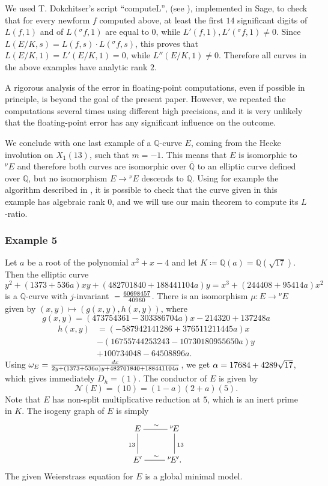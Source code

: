 \documentclass[11pt]{amsart}
\theoremstyle{definition}
\begin{document}
		We used T. Dokchitser's script ``computeL'', (see \cite{computeL}), implemented in Sage, to check that for every newform $f$ computed above, at least the first $14$ significant digits of $L(f,1)$ and of $L({{}^\sigma\!} f,1)$ are equal to $0$, while $L'(f,1),L'({{}^\sigma\!} f,1)\neq 0$. Since $L(E/K,s)=L(f,s)\cdot L({{}^\sigma\!} f,s)$, this proves that $L(E/K,1)=L'(E/K,1)=0$, while $L''(E/K,1)\neq 0$. Therefore all curves in the above examples have analytic rank $2$.

		A rigorous analysis of the error in floating-point computations, even if possible in principle, is beyond the goal of the present paper. However, we repeated the computations several times using different high precisions, and it is very unlikely that the floating-point error has any significant influence on the outcome.
		

		We conclude with one last example of a ${\mathbb{Q}}$-curve $E$, coming from the Hecke involution on $X_1(13)$, such that $m=-1$. This means that $E$ is isomorphic to ${{}^\nu\!} E$ and therefore both curves are isomorphic over ${\overline{\mathbb{Q}}}$ to an elliptic curve defined over ${\mathbb{Q}}$, but no isomorphism $E\to {{}^\nu\!} E$ descends to ${\mathbb{Q}}$. Using for example the algorithm described in \cite{sim}, it is possible to check that the curve given in this example has algebraic rank $0$, and we will use our main theorem to compute its $L$-ratio.

		\subsubsection*{Example 5}
		Let $a$ be a root of the polynomial $x^2+x-4$ and let $K\coloneqq {\mathbb{Q}}(a)={\mathbb{Q}}(\sqrt{17})$. Then the elliptic curve
		$$y^2 + (1373+536 a) x y + (482701840+188441104 a) y = x^3 + (244408+95414 a) x^2$$
		is a ${\mathbb{Q}}$-curve with $j$-invariant ${\displaystyle} -\frac{60698457}{40960}$. There is an isomorphism $\mu\colon E\to {{}^\nu\!} E$ given by $(x,y)\mapsto (g(x,y),h(x,y))$, where
		$$g(x,y)=(473754361-303386704 a) x-214320+ 137248a$$
		\begin{equation*}\begin{split}
		h(x,y)& =(-587942141286+376511211445 a) x\\
			 & -(16755744253243-10730180955650 a ) y\\
			& + 100734048- 64508896 a.
		\end{split}\end{equation*}
		Using ${\displaystyle}\omega_E=\frac{dx}{2y+(1373+536 a)y+482701840+188441104 a}$, we get ${\displaystyle}\alpha=17684+4289\sqrt{17}$, which gives immediately $D_h=(1)$. The conductor of $E$ is given by
		$$\mathcal N(E)=(10)=(1-a)(2+a)(5).$$
		Note that $E$ has non-split multiplicative reduction at $5$, which is an inert prime in $K$. The isogeny graph of $E$ is simply
		$$\begin{xymatrix}{E\ar@{-}[r]^{\sim}\ar@{-}[d]_{13} & {{}^\nu\!} E\ar@{-}[d]^{13} \\ E'\ar@{-}[r]^{\sim} & {{}^\nu\!} E'.}\end{xymatrix}$$
		The given Weierstrass equation for $E$ is a global minimal model.
\end{document}
